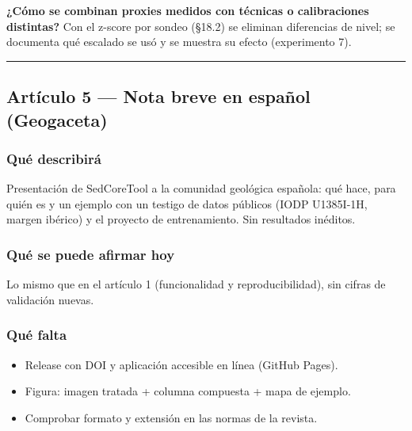 \documentclass[
  10pt,
]{article}
\providecommand{\tightlist}{%
  \setlength{\itemsep}{0pt}\setlength{\parskip}{0pt}}
\begin{document}
\textbf{¿Cómo se combinan proxies medidos con técnicas o calibraciones
distintas?} Con el z-score por sondeo (§18.2) se eliminan diferencias de
nivel; se documenta qué escalado se usó y se muestra su efecto
(experimento 7).

\begin{center}\rule{0.5\linewidth}{0.5pt}\end{center}

\hypertarget{artuxedculo-5-nota-breve-en-espauxf1ol-geogaceta}{%
\subsection{Artículo 5 --- Nota breve en español
(Geogaceta)}\label{artuxedculo-5-nota-breve-en-espauxf1ol-geogaceta}}

\hypertarget{quuxe9-describiruxe1-3}{%
\subsubsection{Qué describirá}\label{quuxe9-describiruxe1-3}}

Presentación de SedCoreTool a la comunidad geológica española: qué hace,
para quién es y un ejemplo con un testigo de datos públicos (IODP
U1385I-1H, margen ibérico) y el proyecto de entrenamiento. Sin
resultados inéditos.

\hypertarget{quuxe9-se-puede-afirmar-hoy-3}{%
\subsubsection{Qué se puede afirmar
hoy}\label{quuxe9-se-puede-afirmar-hoy-3}}

Lo mismo que en el artículo 1 (funcionalidad y reproducibilidad), sin
cifras de validación nuevas.

\hypertarget{quuxe9-falta}{%
\subsubsection{Qué falta}\label{quuxe9-falta}}

\begin{itemize}
\tightlist
\item[$\square$]
  Release con DOI y aplicación accesible en línea (GitHub Pages).
\item[$\square$]
  Figura: imagen tratada + columna compuesta + mapa de ejemplo.
\item[$\square$]
  Comprobar formato y extensión en las normas de la revista.
\end{itemize}
\end{document}
